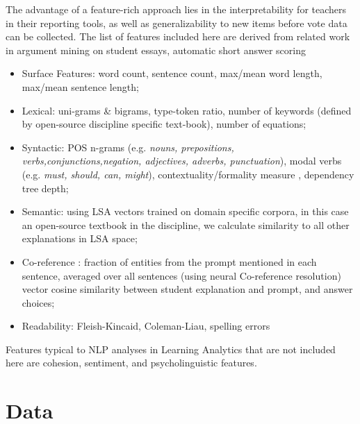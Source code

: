 \documentclass[sigconf]{acmart}
\begin{document}
The advantage of a feature-rich approach lies in the interpretability for 
teachers in their reporting tools, as well as generalizability to new items 
before vote data can be collected.
The list of features included here are derived from related work in argument 
mining \cite{habernal_which_2016}\cite{persing_end--end_2016}on student essays, 
automatic short answer scoring \cite{mohler_text--text_2009}

	\begin{itemize}
		
		\item Surface Features: 
		word count,
		sentence count, 
		max/mean word length, 
		max/mean sentence length;

		\item Lexical: 
		uni-grams \& bigrams, 
		type-token ratio, 
		number of keywords (defined by open-source discipline specific 
		text-book), 
		number of equations;
		
		\item Syntactic: 
		POS n-grams (e.g. \textit{nouns, prepositions, 
		verbs,conjunctions,negation, adjectives, adverbs, punctuation}), 
		modal verbs (e.g. \textit{must, should, can, might}),
		contextuality/formality measure \cite{heylighen_variation_2002},
		dependency tree depth;
		
		\item Semantic:
		using LSA vectors trained on domain specific corpora, in this case an 
		open-source textbook in the discipline, we calculate similarity to all 
		other explanations in LSA space;
		
		\item Co-reference \cite{persing_end--end_2016}: 
			fraction of entities from the prompt mentioned in each sentence, 
			averaged over all sentences (using neural Co-reference resolution)
			vector cosine similarity between student explanation and prompt, 
			and answer choices; 
		
		\item Readability:
			Fleish-Kincaid,
			Coleman-Liau,
			spelling errors
	\end{itemize}


Features typical to NLP analyses in Learning Analytics that are not included 
here are cohesion, sentiment, and psycholinguistic features.





\section{Data}
\end{document}
